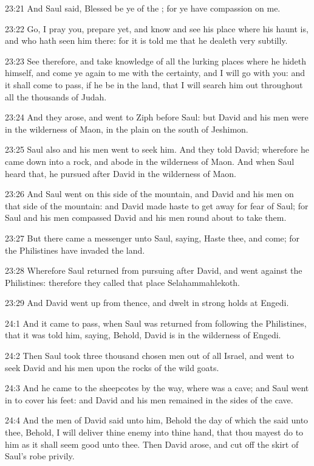 23:21 And Saul said, Blessed be ye of the \LORD; for ye have compassion on me.

23:22 Go, I pray you, prepare yet, and know and see his place where his haunt is, and who hath seen him there: for it is told me that he dealeth very subtilly.

23:23 See therefore, and take knowledge of all the lurking places where he hideth himself, and come ye again to me with the certainty, and I will go with you: and it shall come to pass, if he be in the land, that I will search him out throughout all the thousands of Judah.

23:24 And they arose, and went to Ziph before Saul: but David and his men were in the wilderness of Maon, in the plain on the south of Jeshimon.

23:25 Saul also and his men went to seek him. And they told David; wherefore he came down into a rock, and abode in the wilderness of Maon. And when Saul heard that, he pursued after David in the wilderness of Maon.

23:26 And Saul went on this side of the mountain, and David and his men on that side of the mountain: and David made haste to get away for fear of Saul; for Saul and his men compassed David and his men round about to take them.

23:27 But there came a messenger unto Saul, saying, Haste thee, and come; for the Philistines have invaded the land.

23:28 Wherefore Saul returned from pursuing after David, and went against the Philistines: therefore they called that place Selahammahlekoth.

23:29 And David went up from thence, and dwelt in strong holds at Engedi.

24:1 And it came to pass, when Saul was returned from following the Philistines, that it was told him, saying, Behold, David is in the wilderness of Engedi.

24:2 Then Saul took three thousand chosen men out of all Israel, and went to seek David and his men upon the rocks of the wild goats.

24:3 And he came to the sheepcotes by the way, where was a cave; and Saul went in to cover his feet: and David and his men remained in the sides of the cave.

24:4 And the men of David said unto him, Behold the day of which the \LORD said unto thee, Behold, I will deliver thine enemy into thine hand, that thou mayest do to him as it shall seem good unto thee. Then David arose, and cut off the skirt of Saul's robe privily.


